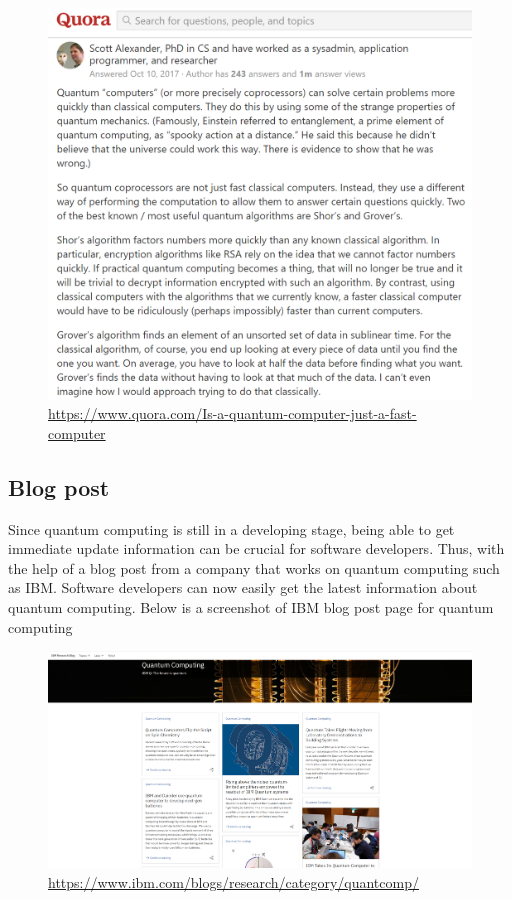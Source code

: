 \documentclass{article}
\begin{document}
\begin{figure}[htbp]
\centerline{\includegraphics[width=\textwidth]{11.png}}
\caption{\url{https://www.quora.com/Is-a-quantum-computer-just-a-fast-computer}}
\label{fig}
\end{figure}
\newpage

\subsection{Blog post}
Since quantum computing is still in a developing stage, being able to get immediate update information can be crucial for software developers. Thus, with the help of a blog post from a company that works on quantum computing such as IBM. Software developers can now easily get the latest information about quantum computing. Below is a screenshot of IBM blog post page for quantum computing

\begin{figure}[htbp]
\centerline{\includegraphics[width=\textwidth]{7.png}}
\caption{\url{https://www.ibm.com/blogs/research/category/quantcomp/}}
\label{fig}
\end{figure}
\newpage
\end{document}
